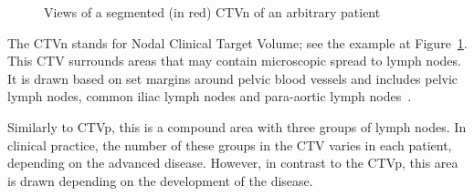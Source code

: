 \documentclass[12pt,twoside]{report}
\begin{document}
\begin{figure}[H]
  \centering
  \caption{Views of a segmented (in red) CTVn of an arbitrary patient}\label{fig:example-CTVn}
\end{figure}

The CTVn stands for Nodal Clinical Target Volume; see the example at Figure~\ref{fig:example-CTVn}. This CTV surrounds areas that may contain microscopic spread to lymph nodes. It is drawn based on set margins around pelvic blood vessels and includes pelvic lymph nodes, common iliac lymph nodes and para-aortic lymph nodes~\cite{AMLART-data}.

Similarly to CTVp, this is a compound area with three groups of lymph nodes. In clinical practice, the number of these groups in the CTV varies in each patient, depending on the advanced disease. %
However, in contrast to the CTVp, this area is drawn depending on the development of the disease.
\end{document}
